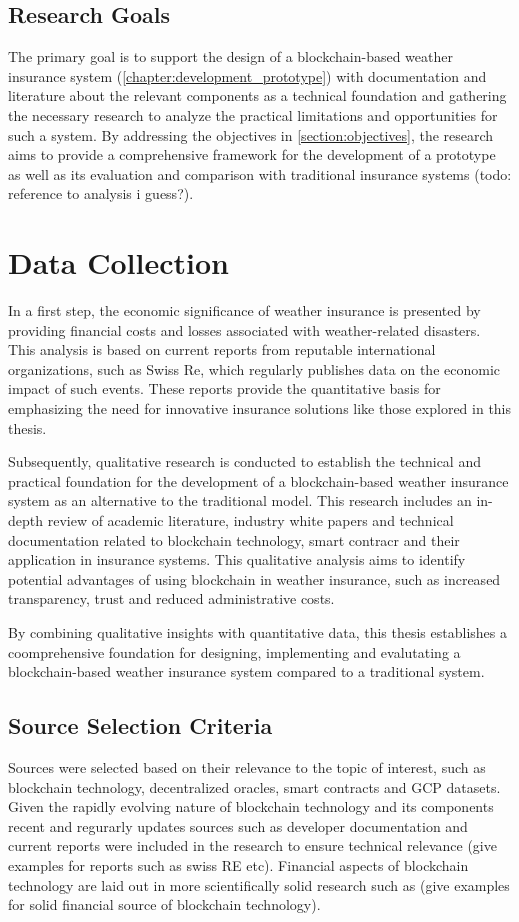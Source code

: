 \subsection{Research Goals}
The primary goal is to support the design of a blockchain-based weather insurance system (\cref{chapter:development_prototype}) with documentation and literature about the relevant components as a technical foundation and gathering the necessary research to analyze the practical limitations and opportunities for such a system. By addressing the objectives in \cref{section:objectives}, the research aims to provide a comprehensive framework for the development of a prototype as well as its evaluation and comparison with traditional insurance systems (todo: reference to analysis i guess?).

\section{Data Collection}\label{section:data_collection}

In a first step, the economic significance of weather insurance is presented by providing financial costs and losses associated with weather-related disasters. This analysis is based on current reports from reputable international organizations, such as Swiss Re, which regularly publishes data on the economic impact of such events. These reports provide the quantitative basis for emphasizing the need for innovative insurance solutions like those explored in this thesis.

Subsequently, qualitative research is conducted to establish the technical and practical foundation for the development of a blockchain-based weather insurance system as an alternative to the traditional model. This research includes an in-depth review of academic literature, industry white papers and technical documentation related to blockchain technology, smart contracr and their application in insurance systems. This qualitative analysis aims to identify potential advantages of using blockchain in weather insurance, such as increased transparency, trust and reduced administrative costs.

By combining qualitative insights with quantitative data, this thesis establishes a coomprehensive foundation for designing, implementing and evalutating a blockchain-based weather insurance system compared to a traditional system.

\subsection{Source Selection Criteria}
Sources were selected based on their relevance to the topic of interest, such as blockchain technology, decentralized oracles, smart contracts and GCP datasets. Given the rapidly evolving nature of blockchain technology and its components  recent and regurarly updates sources such as developer documentation and current reports were included in the research to ensure technical relevance (give examples for reports such as swiss RE etc). Financial aspects of blockchain technology are laid out in more scientifically solid research such as (give examples for solid financial source of blockchain technology). 

